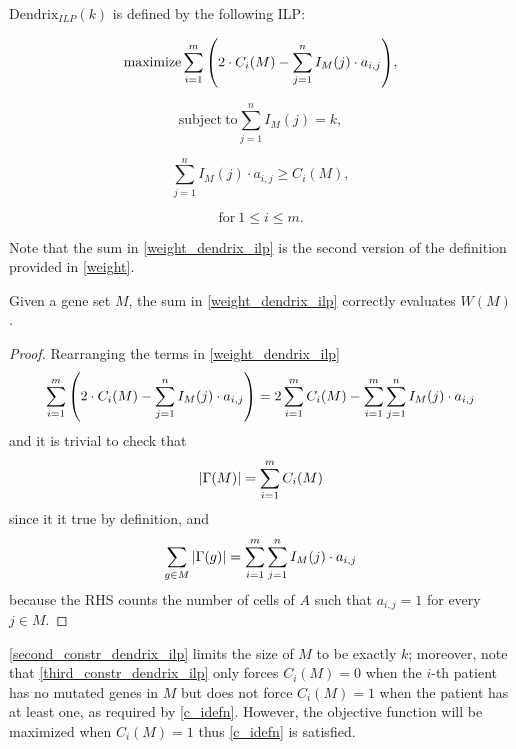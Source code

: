 \begin{definition}
    $\mathrm{Dendrix}_{\mathrm{\textit{ILP}}}(k)$ is defined by the following ILP:

    \begin{equation} \label{weight_dendrix_ilp}
        \mathrm{maximize} \sum_{i = 1}^m {\left(2 \cdot C_i(M) - \sum_{j = 1}^n I_M(j) \cdot a_{i, j}\right)},
    \end{equation}

    \begin{equation} \label{second_constr_dendrix_ilp}
        \mathrm{subject \ to} \sum_{j = 1}^n{I_M(j) = k},
    \end{equation}

    \begin{equation} \label{third_constr_dendrix_ilp}
        \sum_{j = 1}^n I_M(j) \cdot {a_{i, j}} \ge C_i(M),
    \end{equation}

    \begin{equation*}
        \mathrm{for\ } 1 \le i \le m.
    \end{equation*}
\end{definition}

Note that the sum in \cref{weight_dendrix_ilp} is the second version of the definition provided in \cref{weight}.

\begin{lemma} Given a gene set $M$, the sum in \cref{weight_dendrix_ilp} correctly evaluates $W(M)$.
\end{lemma}

\begin{proof}
    Rearranging the terms in \cref{weight_dendrix_ilp} $$\sum_{i = 1}^m {\left(2 \cdot C_i(M) - \sum_{j = 1}^n I_M(j) \cdot a_{i, j}\right)} = 2\sum_{i = 1}^m {C_i(M)} - \sum_{i = 1}^m {\sum_{j = 1}^n {I_M(j) \cdot a_{i, j}}}$$ and it is trivial to check that $$\left|\Gamma(M)\right| = \sum_{i = 1}^m {C_i(M)}$$ since it it true by definition, and $$\sum_{g \in M}{\left|\Gamma(g)\right|} = \sum_{i = 1}^m {\sum_{j = 1}^n {I_M(j) \cdot a_{i, j}}}$$ because the RHS counts the number of cells of $A$ such that $a_{i, j} = 1$ for every $j \in M$.
\end{proof}

\cref{second_constr_dendrix_ilp} limits the size of $M$ to be exactly $k$; moreover, note that \cref{third_constr_dendrix_ilp} only forces $C_i(M) = 0$ when the $i$-th patient has no mutated genes in $M$ but does not force $C_i(M) = 1$ when the patient has at least one, as required by \cref{c_idefn}. However, the objective function will be maximized when $C_i(M)=1$ thus \cref{c_idefn} is satisfied.


